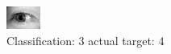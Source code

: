 \begin{figure}[h!]
\begin{center}
\includegraphics[width=0.60\columnwidth]{figures/ID3197_class_3_target_4.png}
\end{center}
\caption{ Classification: 3 actual target: 4}
\label{fig:ID3197_class_3_target_4}
\end{figure}
